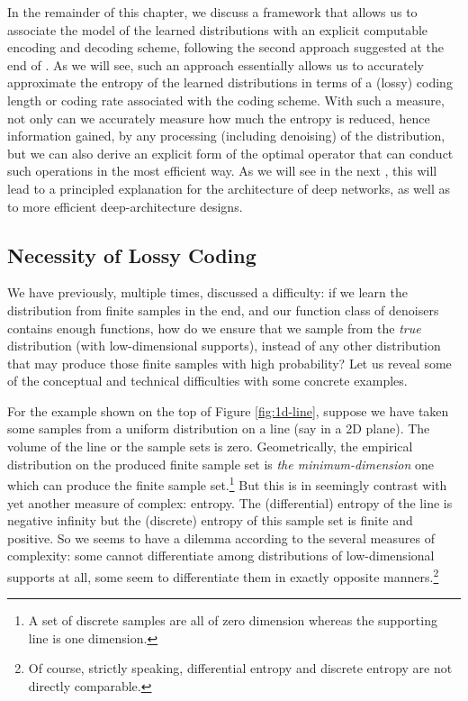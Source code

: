 \documentclass[../../book-main.tex]{subfiles}
\begin{document}
In the remainder of this chapter, we discuss a framework that allows us to associate the model of the learned distributions with an explicit computable encoding and decoding scheme, following the second approach suggested at the end of . As we will see, such an approach essentially allows us to accurately approximate the entropy of the learned distributions in terms of a (lossy) coding length or coding rate associated with the coding scheme. With such a measure, not only can we accurately measure how much the entropy is reduced, hence information gained, by any processing (including denoising) of the distribution, but we can also derive an explicit form of the optimal operator that can conduct such operations in the most efficient way. As we will see in the next , this will lead to a principled explanation for the architecture of deep networks, as well as to more efficient deep-architecture designs.

\subsection{Necessity of Lossy Coding}



We have previously, multiple times, discussed a difficulty: if we learn the distribution from finite samples in the end, and our function class of denoisers contains enough functions, how do we ensure that we sample from the \textit{true} distribution (with low-dimensional supports), instead of any other distribution that may produce those finite samples with high probability? Let us reveal some of the conceptual and technical difficulties with some concrete examples.

\begin{example}\label{eg:measures-of-complexity}
For the example shown on the top of Figure \ref{fig:1d-line}, suppose we have taken some samples from a uniform distribution on a line (say in a 2D plane). The volume of the line or the sample sets is zero. 
Geometrically, the empirical distribution on the produced finite sample set is {\em the minimum-dimension} one which can produce  the finite sample set.\footnote{A set of discrete samples are all of zero dimension whereas the supporting line is one dimension.} But this is in seemingly contrast with yet another measure of complex: entropy. The (differential) entropy of the line is negative infinity but the (discrete) entropy of this sample set is finite and positive. So we seems to have a dilemma according to the several measures of complexity: some cannot differentiate among distributions of low-dimensional supports at all, some seem to differentiate them in exactly opposite manners.\footnote{Of course, strictly speaking, differential entropy and discrete entropy are not directly comparable.}
\end{example}
\end{document}
